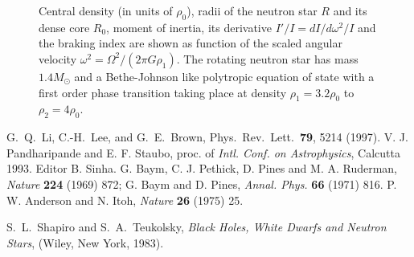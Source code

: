 \clearpage

\begin{figure}
\centerline{
}
\caption{ 
Central density (in units of $\rho_0$), radii of the neutron star $R$ and 
its dense core $R_0$, moment of inertia, its derivative
$I'/I=dI/d\omega^2/I$ and the braking index
are shown as function of the scaled angular velocity
$\omega^2=\Omega^2/(2\pi G\rho_1)$.
The rotating neutron star has mass $1.4M_\odot$ and a Bethe-Johnson like
polytropic
equation of state with a first order phase transition taking
place at density $\rho_1=3.2\rho_0$ to $\rho_2=4\rho_0$.
\label{rot}  }
\end{figure}




 G.\ Q.\ Li, C.-H.\ Lee, and G.\ E.\ Brown,
                       Phys.\ Rev.\ Lett.\ {\bf 79}, 5214 (1997).
 V. J. Pandharipande and E. F. Staubo, proc. of
    {\it Intl. Conf. on Astrophysics}, Calcutta 1993. Editor B. Sinha.
 G. Baym, C. J. Pethick, D. Pines and M. A. Ruderman,
             {\it Nature} {\bf 224} (1969) 872; 
             G. Baym and D. Pines, {\it Annal. Phys.} {\bf 66} (1971) 816.
 P. W. Anderson and N. Itoh, {\it Nature} {\bf 26} (1975) 25.

 S.\ L.\ Shapiro and S.\ A.\ Teukolsky, {\em Black Holes, 
             White Dwarfs and Neutron Stars}, (Wiley, New York, 1983).


